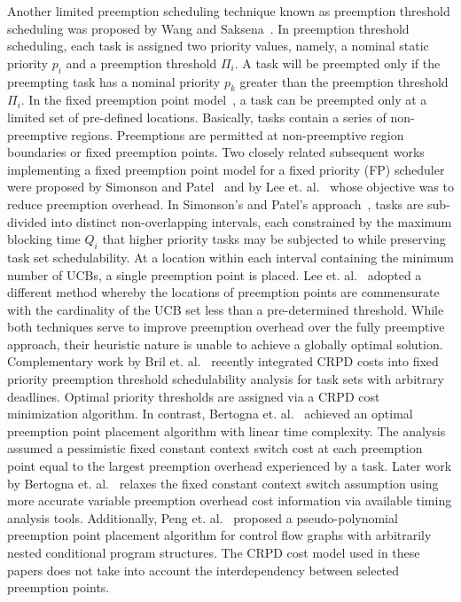 Another limited preemption scheduling technique known as preemption threshold scheduling was proposed by Wang and Saksena~\cite{wang:99}.  In preemption threshold scheduling, each task is assigned two priority values, namely, a nominal static priority \begin{math}p_{i}\end{math} and a preemption threshold \begin{math}\Pi_{i}\end{math}.  A task will be preempted only if the preempting task has a nominal priority \begin{math}p_{k}\end{math} greater than the preemption threshold \begin{math}\Pi_{i}\end{math}. In the fixed preemption point model~\cite{burns:05}, a task can be preempted only at a limited set of pre-defined locations. Basically, tasks contain a series of non-preemptive regions.  Preemptions are permitted at non-preemptive region boundaries or fixed preemption points.
\newline
\indent
Two closely related subsequent works implementing a fixed preemption point model for a fixed priority (FP) scheduler were proposed by Simonson and Patel~\cite{simonson:95} and by Lee et. al.~\cite{lee:98} whose objective was to reduce preemption overhead.  In Simonson’s and Patel’s approach~\cite{simonson:95}, tasks are sub-divided into distinct non-overlapping intervals, each constrained by the maximum blocking time \begin{math}Q_{i}\end{math} that higher priority tasks may be subjected to while preserving task set schedulability.  At a location within each interval containing the minimum number of UCBs, a single preemption point is placed.  Lee et. al.~\cite{lee:98} adopted a different method whereby the locations of preemption points are commensurate with the cardinality of the UCB set less than a pre-determined threshold.   While both techniques serve to improve preemption overhead over the fully preemptive approach, their heuristic nature is unable to achieve a globally optimal solution.  Complementary work by Bril et. al.~\cite{bril:14} recently integrated CRPD costs into fixed priority preemption threshold schedulability analysis for task sets with arbitrary deadlines.  Optimal priority thresholds are assigned via a CRPD cost minimization algorithm.
\newline
\indent
In contrast, Bertogna et. al.~\cite{bertogna:10} achieved an optimal preemption point placement algorithm with linear time complexity.  The analysis assumed a pessimistic fixed constant context switch cost at each preemption point equal to the largest preemption overhead experienced by a task.  Later work by Bertogna et. al.~\cite{bertogna:11} relaxes the fixed constant context switch assumption using more accurate variable preemption overhead cost information via available timing analysis tools.  Additionally, Peng et. al.~\cite{peng:14} proposed a pseudo-polynomial preemption point placement algorithm for control flow graphs with arbitrarily nested conditional program structures.  The CRPD cost model used in these papers does not take into account the interdependency between selected preemption points.
